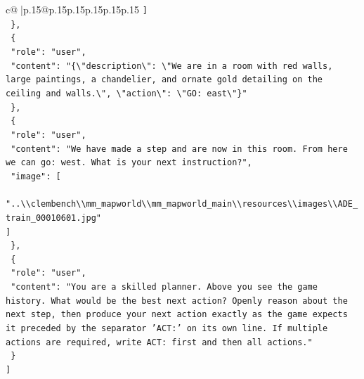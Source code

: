 \documentclass{article}
\begin{document}
{\begin{supertabular}{c@{$\;$}|p{.15\linewidth}@{}p{.15\linewidth}p{.15\linewidth}p{.15\linewidth}p{.15\linewidth}p{.15\linewidth}}
{{{\texttt{    {]}} \\
\texttt{  \},} \\
\texttt{  \{} \\
\texttt{    "role": "user",} \\
\texttt{    "content": "\{\textbackslash{}"description\textbackslash{}": \textbackslash{}"We are in a room with red walls, large paintings, a chandelier, and ornate gold detailing on the ceiling and walls.\textbackslash{}", \textbackslash{}"action\textbackslash{}": \textbackslash{}"GO: east\textbackslash{}"\}"} \\
\texttt{  \},} \\
\texttt{  \{} \\
\texttt{    "role": "user",} \\
\texttt{    "content": "We have made a step and are now in this room. From here we can go: west. What is your next instruction?",} \\
\texttt{    "image": {[}} \\
\texttt{      "..\textbackslash{}\textbackslash{}clembench\textbackslash{}\textbackslash{}mm\_mapworld\textbackslash{}\textbackslash{}mm\_mapworld\_main\textbackslash{}\textbackslash{}resources\textbackslash{}\textbackslash{}images\textbackslash{}\textbackslash{}ADE\_train\_00010601.jpg"} \\
\texttt{    {]}} \\
\texttt{  \},} \\
\texttt{  \{} \\
\texttt{    "role": "user",} \\
\texttt{    "content": "You are a skilled planner. Above you see the game history. What would be the best next action? Openly reason about the next step, then produce your next action exactly as the game expects it preceded by the separator 'ACT:' on its own line. If multiple actions are required, write ACT: first and then all actions."} \\
\texttt{  \}} \\
\texttt{{]}} \\
            }
        }
    }
     \\ \\


\end{supertabular}}
\end{document}
